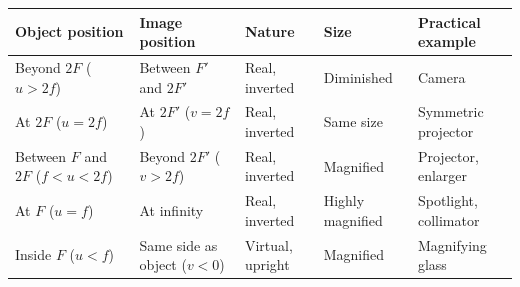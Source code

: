 \documentclass[11pt]{article}
\begin{document}
\begin{center}
\begin{tabularx}{\linewidth}{|l|X|X|X|X|}\hline
\textbf{Object position} & \textbf{Image position} & \textbf{Nature} & \textbf{Size} & \textbf{Practical example} \\ \hline
Beyond $2F$ ($u>2f$) & Between $F'$ and $2F'$ & Real, inverted & Diminished & Camera \\ \hline
At $2F$ ($u=2f$) & At $2F'$ ($v=2f$) & Real, inverted & Same size & Symmetric projector \\ \hline
Between $F$ and $2F$ ($f<u<2f$) & Beyond $2F'$ ($v>2f$) & Real, inverted & Magnified & Projector, enlarger \\ \hline
At $F$ ($u=f$) & At infinity & Real, inverted & Highly magnified & Spotlight, collimator \\ \hline
Inside $F$ ($u<f$) & Same side as object ($v<0$) & Virtual, upright & Magnified & Magnifying glass \\ \hline
\end{tabularx}
\end{center}
\end{document}
